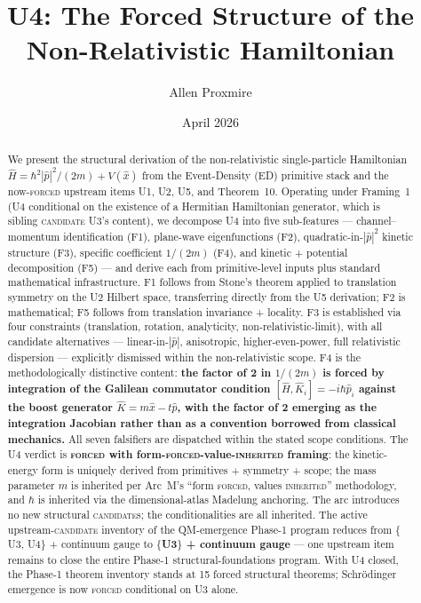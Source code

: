 \documentclass[11pt,a4paper]{article}
\title{U4: The Forced Structure of the Non-Relativistic Hamiltonian}
\author{Allen Proxmire}
\date{April 2026}
\begin{document}
\maketitle

\begin{abstract}
We present the structural derivation of the non-relativistic single-particle Hamiltonian $\hat{H} = \hbar^2 |\hat{p}|^2 / (2m) + V(\hat{x})$ from the Event-Density (ED) primitive stack and the now-\textsc{forced} upstream items U1, U2, U5, and Theorem~10. Operating under Framing~1 (U4 conditional on the existence of a Hermitian Hamiltonian generator, which is sibling \textsc{candidate} U3's content), we decompose U4 into five sub-features --- channel--momentum identification (F1), plane-wave eigenfunctions (F2), quadratic-in-$|\hat{p}|^2$ kinetic structure (F3), specific coefficient $1/(2m)$ (F4), and kinetic + potential decomposition (F5) --- and derive each from primitive-level inputs plus standard mathematical infrastructure. F1 follows from Stone's theorem applied to translation symmetry on the U2 Hilbert space, transferring directly from the U5 derivation; F2 is mathematical; F5 follows from translation invariance + locality. F3 is established via four constraints (translation, rotation, analyticity, non-relativistic-limit), with all candidate alternatives --- linear-in-$|\hat{p}|$, anisotropic, higher-even-power, full relativistic dispersion --- explicitly dismissed within the non-relativistic scope. F4 is the methodologically distinctive content: \textbf{the factor of 2 in $1/(2m)$ is forced by integration of the Galilean commutator condition $[\hat{H}, \hat{K}_i] = -i\hbar \hat{p}_i$ against the boost generator $\hat{K} = m\hat{x} - t\hat{p}$, with the factor of 2 emerging as the integration Jacobian rather than as a convention borrowed from classical mechanics.} All seven falsifiers are dispatched within the stated scope conditions. The U4 verdict is \textbf{\textsc{forced} with form-\textsc{forced}-value-\textsc{inherited} framing}: the kinetic-energy form is uniquely derived from primitives + symmetry + scope; the mass parameter $m$ is inherited per Arc~M's ``form \textsc{forced}, values \textsc{inherited}'' methodology, and $\hbar$ is inherited via the dimensional-atlas Madelung anchoring. The arc introduces no new structural \textsc{candidate}s; the conditionalities are all inherited. The active upstream-\textsc{candidate} inventory of the QM-emergence Phase-1 program reduces from $\{$U3, U4$\}$ + continuum gauge to \textbf{$\{$U3$\}$ + continuum gauge} --- one upstream item remains to close the entire Phase-1 structural-foundations program. With U4 closed, the Phase-1 theorem inventory stands at 15 forced structural theorems; Schr\"odinger emergence is now \textsc{forced} conditional on U3 alone.
\end{abstract}
\end{document}
